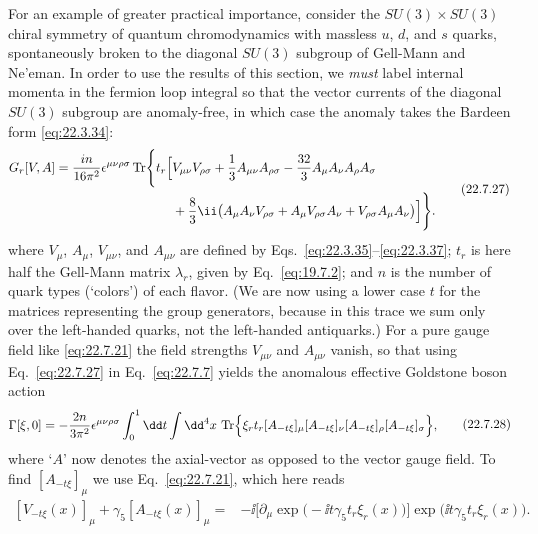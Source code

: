 For an example of greater practical importance, consider the
$SU(3)\times SU(3)$ chiral symmetry of quantum chromodynamics with massless
$u$, $d$, and $s$ quarks, spontaneously broken to the diagonal $SU(3)$
subgroup of Gell-Mann and Ne'eman. In order to use the results of this
section, we \emph{must} label internal momenta in the fermion loop integral
so that the vector currents of the diagonal $SU(3)$ subgroup are
anomaly-free, in which case the anomaly takes the Bardeen form
\eqref{eq:22.3.34}:
\begin{equation}
 \begin{aligned}
 G_r[V,A]
 =\frac{in}{16\pi^2}\epsilon^{\mu\nu\rho\sigma}
 \operatorname{Tr}\Biggl\{t_r\Bigl[
 &V_{\mu\nu}V_{\rho\sigma}
 +\frac{1}{3}A_{\mu\nu}A_{\rho\sigma}
 -\frac{32}{3}A_\mu A_\nu A_\rho A_\sigma
 \\
 &+\frac{8}{3}\ii\bigl(
 A_\mu A_\nu V_{\rho\sigma}
 +A_\mu V_{\rho\sigma}A_\nu
 +V_{\rho\sigma}A_\mu A_\nu
 \bigr)\Bigr]\Biggr\}.
 \end{aligned}
 \tag{22.7.27}\label{eq:22.7.27}
\end{equation}
where $V_\mu$, $A_\mu$, $V_{\mu\nu}$, and $A_{\mu\nu}$ are defined by
Eqs.~\eqref{eq:22.3.35}--\eqref{eq:22.3.37}; $t_r$ is here half the
Gell-Mann matrix $\lambda_r$, given by Eq.~\eqref{eq:19.7.2}; and $n$ is
the number of quark types (`colors') of each flavor. (We are now using a
lower case $t$ for the matrices representing the group generators,
because in this trace we sum only over the left-handed quarks, not the
left-handed antiquarks.) For a pure gauge field like \eqref{eq:22.7.21}
the field strengths $V_{\mu\nu}$ and $A_{\mu\nu}$ vanish, so that using
Eq.~\eqref{eq:22.7.27} in Eq.~\eqref{eq:22.7.7} yields the anomalous
effective Goldstone boson action
\begin{equation}
 \begin{aligned}
 \Gamma[\xi,0]
 =-\frac{2n}{3\pi^2}\epsilon^{\mu\nu\rho\sigma}
 \int_0^1\dd t\int \dd^4x\,
 \operatorname{Tr}\Bigl\{
 \xi_rt_r[A_{-t\xi}]_\mu[A_{-t\xi}]_\nu
 [A_{-t\xi}]_\rho[A_{-t\xi}]_\sigma
 \Bigr\},
 \end{aligned}
 \tag{22.7.28}\label{eq:22.7.28}
\end{equation}
where `$A$' now denotes the axial-vector as opposed to the vector gauge
field. To find $[A_{-t\xi}]_\mu$ we use Eq.~\eqref{eq:22.7.21}, which
here reads
\begin{equation}
 \begin{aligned}
 [V_{-t\xi}(x)]_\mu+\gamma_5[A_{-t\xi}(x)]_\mu
 ={}&-\ii\bigl[\partial_\mu
 \exp\bigl(-\ii t\gamma_5t_r\xi_r(x)\bigr)\bigr]
 \exp\bigl(\ii t\gamma_5t_r\xi_r(x)\bigr).
 \end{aligned}
 \tag{22.7.29}\label{eq:22.7.29}
\end{equation}
